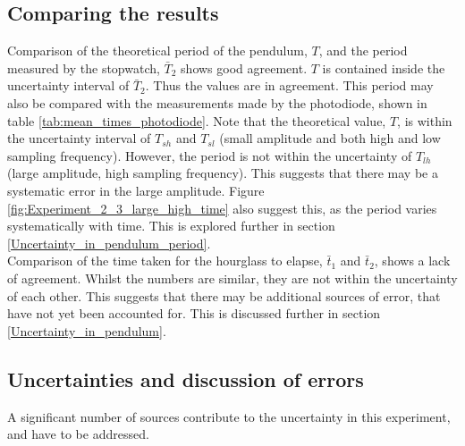 \documentclass[a4paper, 10pt]{article}
\begin{document}
\subsection{Comparing the results}
Comparison of the theoretical period of the pendulum, $T$, and the period measured by the stopwatch, $\bar{T}_2$ shows good agreement. $T$ is contained inside the uncertainty interval of $\bar{T}_2$. Thus the values are in agreement. This period may also be compared with the measurements made by the photodiode, shown in table \ref{tab:mean_times_photodiode}. Note that the theoretical value, $T$, is within the uncertainty interval of $T_{sh}$ and $T_{sl}$ (small amplitude and both high and low sampling frequency). However, the period is not within the uncertainty of $T_{lh}$ (large amplitude, high sampling frequency). This suggests that there may be a systematic error in the large amplitude. Figure \ref{fig:Experiment_2_3_large_high_time} also suggest this, as the period varies systematically with time. This is explored further in section \ref{Uncertainty_in_pendulum_period}.\\
\linebreak
Comparison of the time taken for the hourglass to elapse, $\bar{t}_1$ and $\bar{t}_2$, shows a lack of agreement. Whilst the numbers are similar, they are not within the uncertainty of each other. This suggests that there may be additional sources of error, that have not yet been accounted for. This is discussed further in section \ref{Uncertainty_in_pendulum}.
\subsection{Uncertainties and discussion of errors}
A significant number of sources contribute to the uncertainty in this experiment, and have to be addressed.\\
\end{document}
